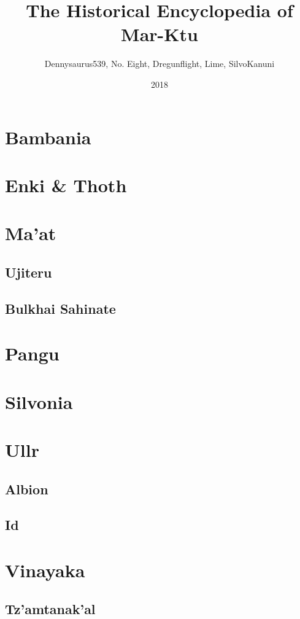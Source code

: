 \documentclass[ansiapaper, 11pt, openright, twoside]{book}
\title{The Historical Encyclopedia of Mar-Ktu}
\date{2018}
\author{Dennysaurus539, No. Eight, Dregunflight, Lime, SilvoKanuni}
\begin{document}
	
	
	\chapter{Bambania}
		\begin{multicols}{2}
			
		\end{multicols}
	\chapter{Enki \& Thoth}
		\begin{multicols}{2}
			
		\end{multicols}
	\chapter{Ma'at}
		\begin{multicols}{2}
			\section{Ujiteru}
				
			\section{Bulkhai Sahinate}
				
		\end{multicols}
	\chapter{Pangu}
		\begin{multicols}{2}
			
		\end{multicols}
	\chapter{Silvonia}
		\begin{multicols}{2}
			
		\end{multicols}
	\chapter{Ullr}
		\begin{multicols}{2}
			\section{Albion}
				
			\section{Id}
				
		\end{multicols}
	\chapter{Vinayaka} 
		\begin{multicols}{2}
			\section{Tz'amtanak'al}
				
		\end{multicols}
	\printindex
	
\end{document}
